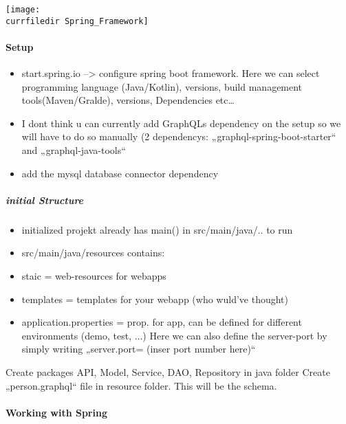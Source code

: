 \texttt{[image: \\currfiledir Spring\_Framework]}

\paragraph{Setup}
    \begin{itemize}
        \item start.spring.io  --> configure spring boot framework. Here we can select programming language (Java/Kotlin), versions, build management tools(Maven/Gralde), versions, Dependencies etc… \\
        \item I dont think u can currently add GraphQLs dependency on the setup so we will have to do so manually (2 dependencys: „graphql-spring-boot-starter“ and „graphql-java-tools“\\
        \item add the mysql database connector dependency
    \end{itemize}

    \subparagraph{initial Structure}
        \begin{itemize}
            \item initialized projekt already has main() in src/main/java/.. to run
            \item src/main/java/resources contains:
            \item staic = web-resources for webapps
            \item templates = templates for your webapp (who wuld've thought)
            \item application.properties = prop. for app, can be defined for different environments (demo, test, ...) Here we can also define the server-port by simply writing „server.port= (inser port number here)“
        \end{itemize}

Create packages API, Model, Service, DAO, Repository in java folder
Create „person.graphql“ file in resource folder. This will be the schema.

\paragraph{Working with Spring}

